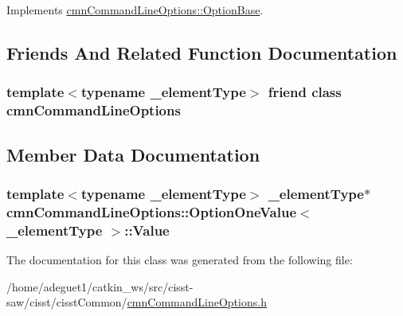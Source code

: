Implements \hyperlink{classcmn_command_line_options_1_1_option_base_a738dbf56caefe3ee0f5eb9c3cc33bdd6}{cmn\-Command\-Line\-Options\-::\-Option\-Base}.



\subsection{Friends And Related Function Documentation}
\hypertarget{classcmn_command_line_options_1_1_option_one_value_a18923f23ed3914806f1edf878a64b422}{
\subsubsection[{cmn\-Command\-Line\-Options}]{\setlength{\rightskip}{0pt plus 5cm}template$<$typename \-\_\-element\-Type$>$ friend class {\bf cmn\-Command\-Line\-Options}\hspace{0.3cm}{\ttfamily [friend]}}}\label{classcmn_command_line_options_1_1_option_one_value_a18923f23ed3914806f1edf878a64b422}


\subsection{Member Data Documentation}
\hypertarget{classcmn_command_line_options_1_1_option_one_value_a340ec92ab141ab98bc7469c78e970eb6}{
\subsubsection[{Value}]{\setlength{\rightskip}{0pt plus 5cm}template$<$typename \-\_\-element\-Type$>$ \-\_\-element\-Type$\ast$ {\bf cmn\-Command\-Line\-Options\-::\-Option\-One\-Value}$<$ \-\_\-element\-Type $>$\-::Value\hspace{0.3cm}{\ttfamily [protected]}}}\label{classcmn_command_line_options_1_1_option_one_value_a340ec92ab141ab98bc7469c78e970eb6}


The documentation for this class was generated from the following file\-:\begin{DoxyCompactItemize}
\item 
/home/adeguet1/catkin\-\_\-ws/src/cisst-\/saw/cisst/cisst\-Common/\hyperlink{cmn_command_line_options_8h}{cmn\-Command\-Line\-Options.\-h}\end{DoxyCompactItemize}
